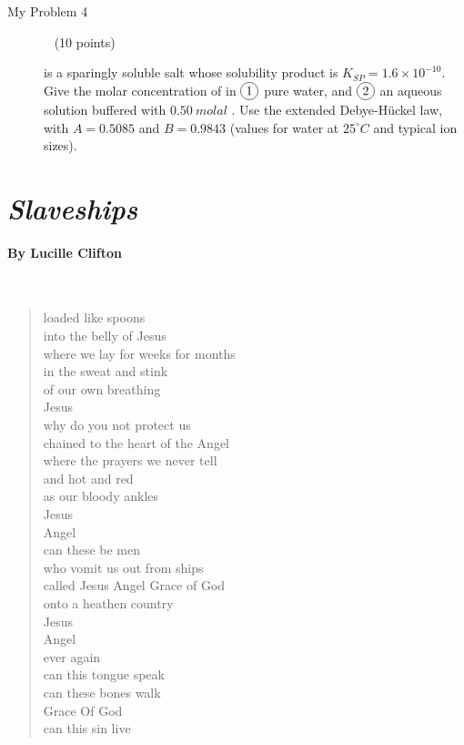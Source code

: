 \documentclass[12pt, openany, letterpaper]{memoir}
\begin{document}
\begin{description}
	      \vspace{18em}
	\item [My Problem 4] ~ (10 points)

	       is a sparingly soluble salt whose solubility product is $K_{SP}=1.6\times10^{-10}$. Give the molar concentration of  in $\circled{1}$ pure water, and $\circled{2}$ an aqueous solution buffered with $0.50~molal$ . Use the extended Debye-H\"uckel law, with $A=0.5085$ and $B=0.9843$ (values for water at $25^\circ C$ and typical ion sizes).

\end{description}

\newpage
\pagestyle{empty}
\addtocounter{page}{-1}
\section*{\emph{Slaveships}}
\paragraph{By Lucille Clifton}~
\begin{verse}
	loaded like spoons\\
	into the belly of Jesus\\
	where we lay for weeks for months\\
	in the sweat and stink\\
	of our own breathing\\
	Jesus\\
	why do you not protect us\\
	chained to the heart of the Angel\\
	where the prayers we never tell\\
	and hot and red\\
	as our bloody ankles\\
	Jesus\\
	Angel\\
	can these be men\\
	who vomit us out from ships\\
	called Jesus    Angel    Grace of God\\
	onto a heathen country\\
	Jesus\\
	Angel\\
	ever again\\
	can this tongue speak\\
	can these bones walk\\
	Grace Of God\\
	can this sin live
\end{verse}
\end{document}
